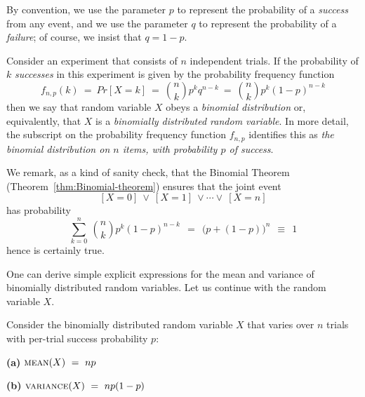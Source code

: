 By convention, we use the parameter $p$ to represent the probability of a {\em success} from any event, and we use the parameter $q$ to represent the probability of a {\em failure}; of course, we insist that $q = 1-p$.

  
Consider an experiment that consists of $n$ independent trials.  If the probability of $k$ {\em successes} in this experiment is given by the probability frequency function
\begin{equation}
\label{eq:binomial-prob-freq}
f_{n,p}(k) \ = \ Pr[X=k] \ = \ {n \choose k} p^k q^{n-k} \ = \ {n \choose k} p^k (1-p)^{n-k}
\end{equation}
then we say that random variable $X$ obeys a {\em binomial distribution} or, equivalently, that $X$ is a {\em binomially distributed random variable}.  In more detail, the subscript on the probability frequency function $f_{n,p}$ identifies this as {\em the binomial distribution on $n$ items, with probability $p$ of success}.

We remark, as a kind of sanity check, that the Binomial Theorem (Theorem~\ref{thm:Binomial-theorem}) ensures that the joint event
\[ [X=0] \ \vee \ [X=1] \ \vee \cdots  \vee \ [X=n] \]
has probability
\[ \sum_{k=0}^n \ {n \choose k} p^k (1-p)^{n-k} \ \ = \ \  \big(p + (1-p) \big)^n \ \ \equiv \ \ 1 \] 
hence is certainly {\sc true}.

\bigskip

One can derive simple explicit expressions for the mean and variance of binomially distributed random variables.  Let us continue with the random variable $X$.

\begin{prop}
\label{thm:bin-vble-mean+variance}
Consider the binomially distributed random variable $X$ that varies over $n$ trials with per-trial success probability $p$:

{\bf (a)} $\mbox{\sc mean}(X) \ = \ np$

{\bf (b)} $\mbox{\sc variance}(X) \ = \ np(1-p)$
\end{prop}


